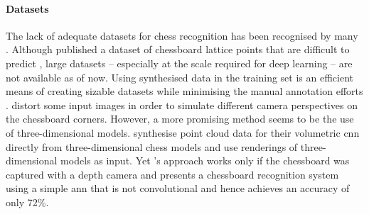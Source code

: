 \paragraph{Datasets}
The lack of adequate datasets for chess recognition has been recognised by many \cite{czyzewski2020,ding2016,mehta2020}.
Although \textcite{czyzewski2020} published a dataset of chessboard lattice points that are difficult to predict \cite{czyzewski2018}, large datasets -- especially at the scale required for deep learning -- are not available as of now.
Using synthesised data in the training set is an efficient means of creating sizable datasets while minimising the manual annotation efforts \cite{wei2017,hou,czyzewski2020}.
\citeauthor{czyzewski2020} distort some input images in order to simulate different camera perspectives on the chessboard corners.
However, a more promising method seems to be the use of three-dimensional models.
\textcite{wei2017} synthesise point cloud data for their volumetric \gls{cnn} directly from three-dimensional chess models and \textcite{hou} use renderings of three-dimensional models as input. 
Yet \textcite{wei2017}'s approach works only if the chessboard was captured with a depth camera and \textcite{hou} presents a chessboard recognition system using a simple \gls{ann} that is not convolutional and hence achieves an accuracy of only 72\%.
